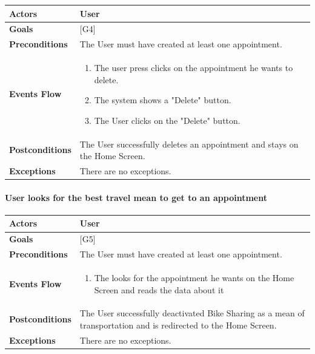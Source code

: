 \documentclass[12pt]{article}
\begin{document}
\begin{center}
    \begin{tabular} { |p{}|p{}| }
        \hline
        \textbf{Actors} & User \\ 
        \hline
        \textbf{Goals} & {[G4]} \\ 
        \hline  
        \textbf{Preconditions} & The User must have created at least one appointment. \\ 
        \hline
        \textbf{Events Flow} & \begin{enumerate} 
                            \setlength{\itemsep}{0.5pt}
                            \item The user press clicks on the appointment he wants to delete.
                            \item The system shows a "Delete" button.
                            \item The User clicks on the "Delete" button.
                            \end{enumerate} \\
        \hline
        \textbf{Postconditions} & The User successfully deletes an appointment and stays on the Home Screen. \\
        \hline
        \textbf{Exceptions} & There are no exceptions.\\ 
        \hline
    \end{tabular}
\end{center}

\paragraph{User looks for the best travel mean to get to an appointment}
\begin{center}
    \begin{tabular} { |p{}|p{}| }
        \hline
        \textbf{Actors} & User \\ 
        \hline
        \textbf{Goals} & {[G5]} \\ 
        \hline  
        \textbf{Preconditions} & The User must have created at least one appointment. \\ 
        \hline
        \textbf{Events Flow} & \begin{enumerate} 
                            \setlength{\itemsep}{0.5pt}
                            \item The looks for the appointment he wants on the Home Screen and reads the data about it
                            \end{enumerate} \\
        \hline
        \textbf{Postconditions} & The User successfully deactivated Bike Sharing as a mean of transportation and is redirected to the Home Screen. \\
        \hline
        \textbf{Exceptions} & There are no exceptions.\\ 
        \hline
     \end{tabular}
\end{center}
\end{document}
